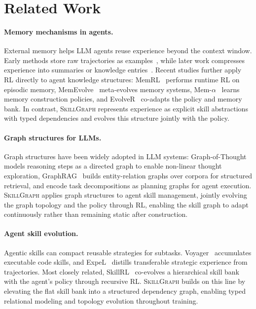 \section{Related Work}
\label{sec:related}

\paragraph{Memory mechanisms in agents.}
External memory helps LLM agents reuse experience beyond the context window. Early methods store raw trajectories as examples~\citep{zhao2024expel, chhikara2025mem0}, while later work compresses experience into summaries or knowledge entries~\citep{fang2025memp, liu2025simplemem, ouyang2025reasoningbank, tang2025agentkb}. Recent studies further apply RL directly to agent knowledge structures: MemRL~\citep{zhang2026memrl} performs runtime RL on episodic memory, MemEvolve~\citep{zhang2025memevolve} meta-evolves memory systems, Mem-$\alpha$~\citep{wang2025mem_alpha} learns memory construction policies, and EvolveR~\citep{wu2025evolver} co-adapts the policy and memory bank. In contrast, \textsc{SkillGraph} represents experience as explicit skill abstractions with typed dependencies and evolves this structure jointly with the policy.

\paragraph{Graph structures for LLMs.}
Graph structures have been widely adopted in LLM systems: Graph-of-Thought~\citep{besta2024got} models reasoning steps as a directed graph to enable non-linear thought exploration, GraphRAG~\citep{edge2024graphrag} builds entity-relation graphs over corpora for structured retrieval, and \citet{huang2024graphplan} encode task decompositions as planning graphs for agent execution. \textsc{SkillGraph} applies graph structures to agent skill management, jointly evolving the graph topology and the policy through RL, enabling the skill graph to adapt continuously rather than remaining static after construction.

\paragraph{Agent skill evolution.}
Agentic skills can compact reusable strategies for subtasks. Voyager~\citep{wang2023voyager} accumulates executable code skills, and ExpeL~\citep{zhao2024expel} distills transferable strategic experience from trajectories. Most closely related, SkillRL~\citep{xia2025skillrl} co-evolves a hierarchical skill bank with the agent's policy through recursive RL. \textsc{SkillGraph} builds on this line by elevating the flat skill bank into a structured dependency graph, enabling typed relational modeling and topology evolution throughout training.
